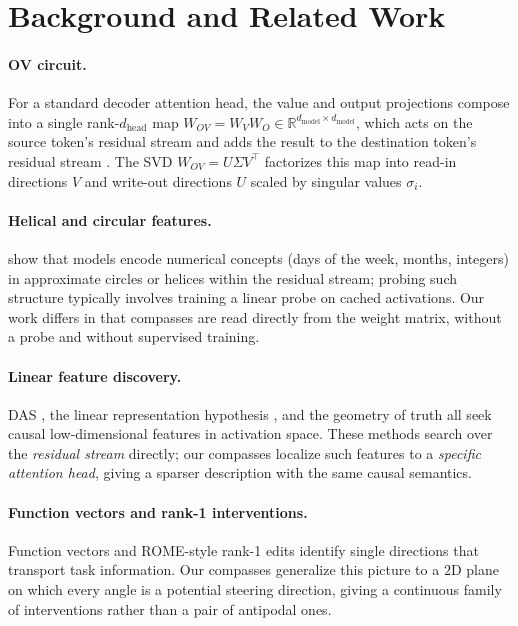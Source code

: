 \section{Background and Related Work}
\label{sec:background}

\paragraph{OV circuit.} For a standard decoder attention head, the value and
output projections compose into a single rank-$d_\text{head}$ map
$W_{OV} = W_V W_O \in \mathbb{R}^{d_\text{model}\times d_\text{model}}$,
which acts on the source token's residual stream and adds the result to the
destination token's residual stream \citep{elhage2021mathematical}. The SVD
$W_{OV} = U\Sigma V^\top$ factorizes this map into read-in directions $V$ and
write-out directions $U$ scaled by singular values $\sigma_i$.

\paragraph{Helical and circular features.}
\citet{engels2024not} show that models encode numerical concepts (days of the
week, months, integers) in approximate circles or helices within the residual
stream; probing such structure typically involves training a linear probe on
cached activations. Our work differs in that compasses are read directly from
the weight matrix, without a probe and without supervised training.

\paragraph{Linear feature discovery.} DAS \citep{geiger2024das}, the linear
representation hypothesis \citep{park2024linearrep}, and the geometry of truth
\citep{marks2024geometry} all seek causal low-dimensional features in
activation space. These methods search over the \emph{residual stream}
directly; our compasses localize such features to a \emph{specific
attention head}, giving a sparser description with the same causal semantics.

\paragraph{Function vectors and rank-1 interventions.} Function vectors
\citep{todd2024function} and ROME-style rank-1 edits \citep{meng2022rome}
identify single directions that transport task information. Our compasses
generalize this picture to a $2$D plane on which every angle is a potential
steering direction, giving a continuous family of interventions rather than a
pair of antipodal ones.
